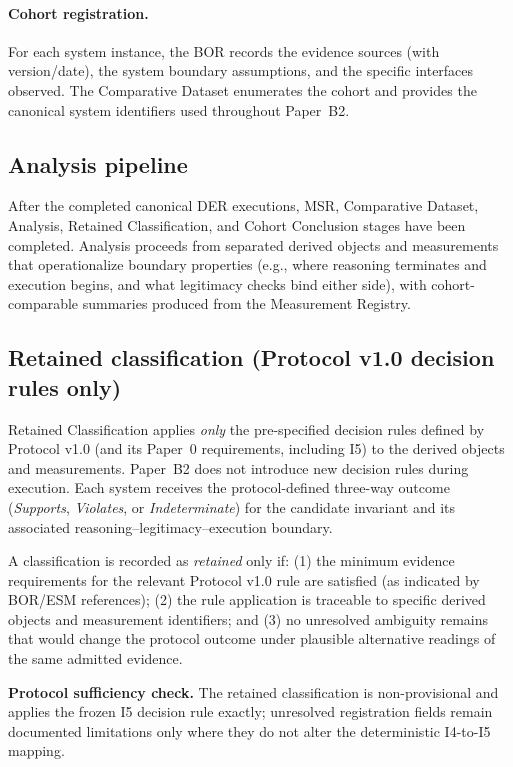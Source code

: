 \paragraph{Cohort registration.}
For each system instance, the BOR records the evidence sources (with version/date), the system boundary assumptions, and the specific interfaces observed. The Comparative Dataset enumerates the cohort and provides the canonical system identifiers used throughout Paper~B2.

\subsection{Analysis pipeline}
\label{sec:analysis-pipeline}
After the completed canonical DER executions, MSR, Comparative Dataset, Analysis, Retained Classification, and Cohort Conclusion stages have been completed. Analysis proceeds from separated derived objects and measurements that operationalize boundary properties (e.g., where reasoning terminates and execution begins, and what legitimacy checks bind either side), with cohort-comparable summaries produced from the Measurement Registry.

\subsection{Retained classification (Protocol v1.0 decision rules only)}
\label{sec:retained-classification-method}
Retained Classification applies \emph{only} the pre-specified decision rules defined by Protocol v1.0 (and its Paper~0 requirements, including I5) to the derived objects and measurements. Paper~B2 does not introduce new decision rules during execution. Each system receives the protocol-defined three-way outcome (\emph{Supports}, \emph{Violates}, or \emph{Indeterminate}) for the candidate invariant and its associated reasoning--legitimacy--execution boundary.

A classification is recorded as \emph{retained} only if: (1) the minimum evidence requirements for the relevant Protocol v1.0 rule are satisfied (as indicated by BOR/ESM references); (2) the rule application is traceable to specific derived objects and measurement identifiers; and (3) no unresolved ambiguity remains that would change the protocol outcome under plausible alternative readings of the same admitted evidence.

\textbf{Protocol sufficiency check.} The retained classification is non-provisional and applies the frozen I5 decision rule exactly; unresolved registration fields remain documented limitations only where they do not alter the deterministic I4-to-I5 mapping.

